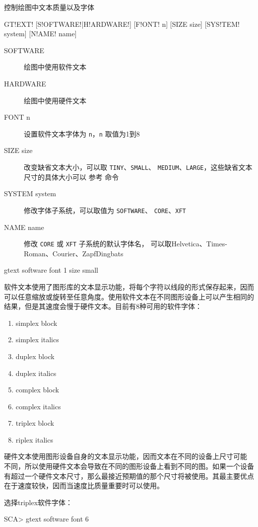 \label{cmd:gtext}

控制绘图中文本质量以及字体

\begin{SACSTX}
GT!EXT! [S!OFTWARE!|H!ARDWARE!] [F!ONT! n] [SIZE size] [SYS!TEM! system]
    [N!AME! name]
\end{SACSTX}

\begin{description}
\item [SOFTWARE]  绘图中使用软件文本
\item [HARDWARE]  绘图中使用硬件文本
\item [FONT n] 设置软件文本字体为 \texttt{n}，\texttt{n} 取值为1到8
\item [SIZE size]  改变缺省文本大小，可以取 \texttt{TINY}、\texttt{SMALL}、
    \texttt{MEDIUM}、\texttt{LARGE}，这些缺省文本尺寸的具体大小可以
    参考  命令
\item [SYSTEM system] 修改字体子系统，可以取值为 \texttt{SOFTWARE}、
    \texttt{CORE}、\texttt{XFT}
\item [NAME name] 修改 \texttt{CORE} 或 \texttt{XFT} 子系统的默认字体名，
    可以取Helvetica、Times-Roman、Courier、ZapfDingbats
\end{description}

\begin{SACDFT}
gtext software font 1 size small
\end{SACDFT}

软件文本使用了图形库的文本显示功能，将每个字符以线段的形式保存起来，因而
可以任意缩放或旋转至任意角度。使用软件文本在不同图形设备上可以产生相同的
结果，但是其速度会慢于硬件文本。目前有8种可用的软件字体：
\begin{enumerate}
\item simplex block
\item simplex italics
\item duplex block
\item duplex italics
\item complex block
\item complex italics
\item triplex block
\item riplex italics
\end{enumerate}

硬件文本使用图形设备自身的文本显示功能，因而文本在不同的设备上尺寸可能
不同，所以使用硬件文本会导致在不同的图形设备上看到不同的图。如果一个设备
有超过一个硬件文本尺寸，那么最接近预期值的那个尺寸将被使用。其最主要优点
在于速度较快，因而当速度比质量重要时可以使用。

选择triplex软件字体：
\begin{SACCode}
SCA> gtext software font 6
\end{SACCode}
